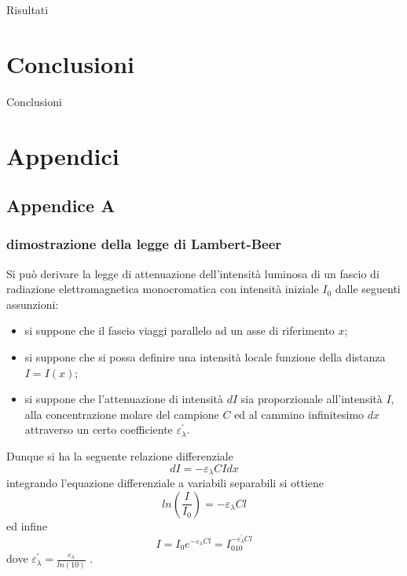 \documentclass[12pt,a4paper, twoside, openright]{report}
\begin{document}
Risultati




\chapter{Conclusioni}



Conclusioni




\chapter*{Appendici}



\section*{Appendice A}


\subsection{dimostrazione della legge di Lambert-Beer}

Si può derivare la legge di attenuazione dell'intensità luminosa di un fascio di radiazione elettromagnetica monocromatica con intensità iniziale $I_0$ dalle seguenti assunzioni:\begin{itemize}
    \item si suppone che il fascio viaggi parallelo ad un asse di riferimento $x$;
    \item si suppone che si possa definire una intensità locale funzione della distanza 		  $I = I(x)$;
    \item si suppone che l'attenuazione di intensità $dI$ sia proporzionale 						  all'intensità $I$, alla concentrazione molare del campione $C$ ed al cammino 				  infinitesimo $dx$ attraverso un certo coefficiente $\varepsilon_{\lambda}^{'}				  $.
\end{itemize}
Dunque si ha la seguente relazione differenziale
\begin{equation*}
    dI = -\varepsilon_{\lambda}CI dx
\end{equation*}
integrando l'equazione differenziale a variabili separabili si ottiene
\begin{equation*}
    ln(\frac{I}{I_0}) = -\varepsilon_{\lambda}Cl
\end{equation*}
ed infine
\begin{equation*}
    I = I_0e^{-\varepsilon_{\lambda}Cl} = I_010^{-\varepsilon_{\lambda}^{'}Cl}
\end{equation*}
dove $\varepsilon_{\lambda}^{'} = \frac{\varepsilon_{\lambda}}{ln(10)}$ .
\end{document}
